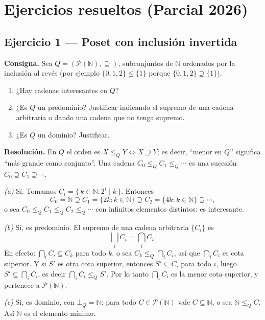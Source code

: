 \section*{Ejercicios resueltos (Parcial 2026)}

\subsection*{Ejercicio 1 — Poset con inclusión invertida}
\textbf{Consigna.} Sea $Q = (\mathcal{P}(\mathbb{N}), \supseteq)$, subconjuntos de $\mathbb{N}$
ordenados por la inclusión al revés (por ejemplo $\{0,1,2\} \le \{1\}$ porque
$\{0,1,2\} \supseteq \{1\}$).
\begin{enumerate}
  \item[(a)] ¿Hay cadenas interesantes en $Q$?
  \item[(b)] ¿Es $Q$ un predominio? Justificar indicando el supremo de una cadena
        arbitraria o dando una cadena que no tenga supremo.
  \item[(c)] ¿Es $Q$ un dominio? Justificar.
\end{enumerate}

\noindent\textbf{Resolución.} En $Q$ el orden es $X \le_Q Y \iff X \supseteq Y$; es
decir, ``menor en $Q$'' significa ``más grande como conjunto''. Una cadena
$C_0 \le_Q C_1 \le_Q \cdots$ es una sucesión $C_0 \supseteq C_1 \supseteq \cdots$.

\smallskip
\noindent\emph{(a)} Sí. Tomamos $C_i = \{\, k \in \mathbb{N} : 2^i \mid k \,\}$. Entonces
\[
C_0 = \mathbb{N} \supsetneq C_1 = \{2k : k\in\mathbb{N}\} \supsetneq C_2 = \{4k : k\in\mathbb{N}\} \supsetneq \cdots,
\]
o sea $C_0 \le_Q C_1 \le_Q C_2 \le_Q \cdots$ con infinitos elementos distintos:
es interesante.

\smallskip
\noindent\emph{(b)} Sí, es predominio. El supremo de una cadena arbitraria $\{C_i\}$ es
\[
\bigsqcup_i C_i = \bigcap_i C_i.
\]
En efecto: $\bigcap_i C_i \subseteq C_k$ para todo $k$, o sea $C_k \le_Q \bigcap_i C_i$,
así que $\bigcap_i C_i$ es cota superior. Y si $S'$ es otra cota superior, entonces
$S' \subseteq C_i$ para todo $i$, luego $S' \subseteq \bigcap_i C_i$, es decir
$\bigcap_i C_i \le_Q S'$. Por lo tanto $\bigcap_i C_i$ es la menor cota superior, y
pertenece a $\mathcal{P}(\mathbb{N})$.

\smallskip
\noindent\emph{(c)} Sí, es dominio, con $\bot_Q = \mathbb{N}$: para todo
$C \in \mathcal{P}(\mathbb{N})$ vale $C \subseteq \mathbb{N}$, o sea $\mathbb{N} \le_Q C$.
Así $\mathbb{N}$ es el elemento mínimo.

